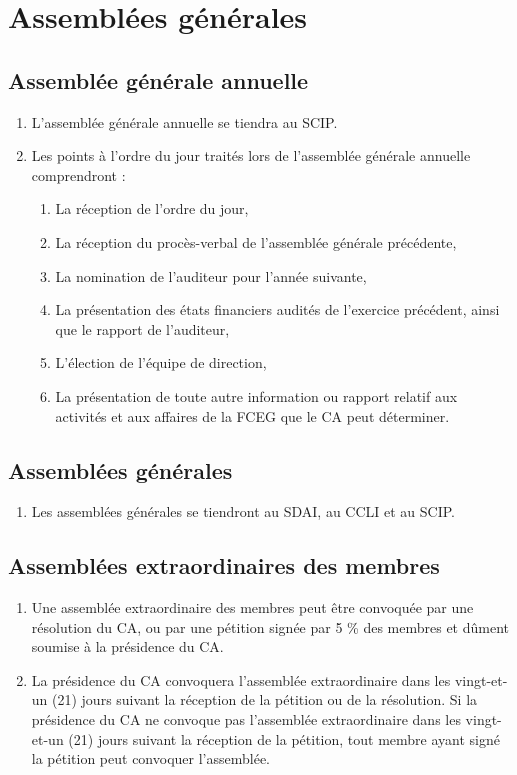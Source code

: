\section{Assemblées générales}
\label{assemblees-generales}

\subsection{Assemblée générale annuelle}
\label{assemblees-generales-assemblee-generale-annuelle}

\begin{enumerate}
 \item L'assemblée générale annuelle se tiendra au SCIP.
 \item Les points à l'ordre du jour traités lors de l'assemblée générale annuelle comprendront :
  \begin{enumerate}
   \item La réception de l'ordre du jour,
   \item La réception du procès-verbal de l'assemblée générale précédente,
   \item La nomination de l’auditeur pour l'année suivante,
   \item La présentation des états financiers audités de l'exercice précédent, ainsi que le rapport de l’auditeur,
   \item L'élection de l'équipe de direction,
   \item La présentation de toute autre information ou rapport relatif aux activités et aux affaires de la FCEG que le CA peut déterminer.
  \end{enumerate}
\end{enumerate}

\subsection{Assemblées générales}
\label{assemblees-generales-assemblees-generales}

\begin{enumerate}
 \item Les assemblées générales se tiendront au SDAI, au CCLI et au SCIP.
\end{enumerate}

\subsection{Assemblées extraordinaires des membres}
\label{assemblees-generales-assemblees-extraordinaires-des-membres}

\begin{enumerate}
 \item Une assemblée extraordinaire des membres peut être convoquée par une résolution du CA, ou par une pétition signée par 5 \% des membres et dûment soumise à la présidence du CA.
 \item La présidence du CA convoquera l'assemblée extraordinaire dans les vingt-et-un (21) jours suivant la réception de la pétition ou de la résolution. Si la présidence du CA ne convoque pas l'assemblée extraordinaire dans les vingt-et-un (21) jours suivant la réception de la pétition, tout membre ayant signé la pétition peut convoquer l'assemblée.
\end{enumerate}
